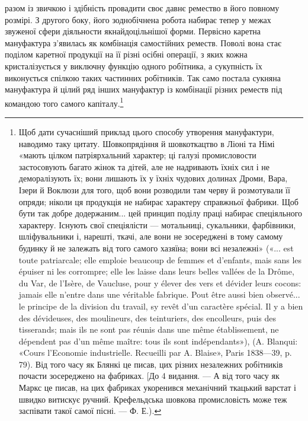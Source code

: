 \parcont{}  %
разом із звичкою і здібність провадити своє давнє ремество в
його повному розмірі. З другого боку, його зоднобічнена робота
набирає тепер у межах звуженої сфери діяльности якнайдоцільнішої
форми. Первісно каретна мануфактура з’явилась як комбінація
самостійних реместв. Поволі вона стає поділом каретної
продукції на її різні осібні операції, з яких кожна кристалізується
у виключну функцію одного робітника, а сукупність їх
виконується спілкою таких частинних робітників. Так само
постала сукняна мануфактура й цілий ряд інших мануфактур
із комбінації різних реместв під командою того самого капіталу.\footnote{
Щоб дати сучасніший приклад цього способу утворення мануфактури,
наводимо таку цитату. Шовкопрядіння й шовкоткацтво в
Ліоні та Німі «мають цілком патріярхальний характер; ці галузі промисловости
застосовують багато жінок та дітей, але не надривають їхніх
сил і не деморалізують їх; вони лишають їх у їхніх чудових долинах Дроми,
Вара, Ізери й Воклюзи для того, щоб вони розводили там черву й розмотували
її опряди; ніколи ця продукція не набирає характеру справжньої
фабрики. Щоб бути так добре додержаним... цей принцип поділу праці
набирає спеціяльного характеру. Існують свої спеціялісти — мотальниці,
сукальники, фарбівники, шліфувальники і, нарешті, ткачі, але вони не
зосереджені в тому самому будинку й не залежать від того самого хазяїна;
вони всі незалежні» («... est toute patriarcale; elle emploie beaucoup de
femmes et d’enfants, mais sans les épuiser ni les corrompre; elle les laisse
dans leurs belles vallées de la Drôme, du Var, de l’Isère, de Vaucluse, pour
y élever des vers et dévider leurs cocons: jamais elle n’entre dans une véritable
fabrique. Pout être aussi bien observé... le principe de la division
du travail, sy revêt d’un caractère spécial. Il y a bien des dévideuses, des
moulineurs, des teinturiers, des encolleurs, puis des tisserands; mais ils
ne sont pas réunis dans une même établissement, ne dépendent pas d’un
même maître: tous ils sont indépendants»), (A. Blanqui: «Cours l'Economie
industrielle. Recueilli par A. Blaise», Paris 1838—39, p. 79).
Від того часу як Блянкі це писав, цих різних незалежних робітників
почасти зосереджено на фабриках. [До 4 видання. — А від того часу
як Маркс це писав, на цих фабриках укоренився механічний ткацький
варстат і швидко витискує ручний. Крефельдська шовкова промисловість
може теж заспівати такої самої пісні. — Ф. Е.).
}

